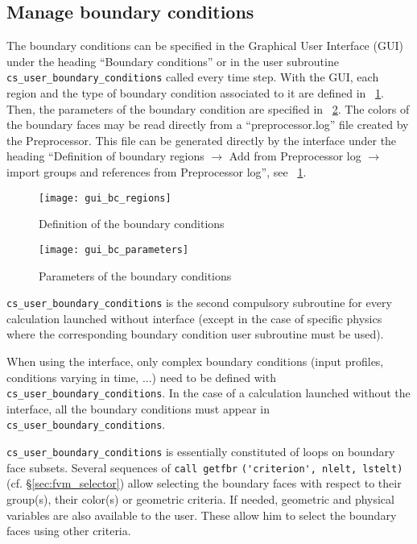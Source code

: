 {{{%
\subsection{Manage boundary conditions}
\label{sec:prg_boundaryconditions}
The boundary conditions can be specified in the Graphical User Interface (GUI) under the heading ``Boundary conditions''
or in the user subroutine \texttt{cs\_user\_boundary\_conditions} called every time step.
With the GUI, each region and the type of boundary condition associated to it are defined in
\figurename~\ref{fig:gui_bc_regions}. Then, the parameters of the boundary condition are specified
 in \figurename~\ref{fig:gui_bc_parameters}. The colors of the boundary faces may be read directly from
a ``preprocessor.log'' file created by the Preprocessor. This file can be generated directly by the interface
under the heading ``Definition of boundary regions $\rightarrow$ Add from Preprocessor log $\rightarrow$ import groups and references from Preprocessor log'', see \figurename~\ref{fig:gui_bc_regions}.
%
\begin{figure}[!ht]
\begin{center}
\texttt{[image: gui\_bc\_regions]}
\caption{Definition of the boundary conditions}
\label{fig:gui_bc_regions}
\end{center}
\end{figure}
%
\begin{figure}[!ht]
\begin{center}
\texttt{[image: gui\_bc\_parameters]}
\caption{Parameters of the boundary conditions}
\label{fig:gui_bc_parameters}
\end{center}
\end{figure}
%
\texttt{cs\_user\_boundary\_conditions} is the second compulsory subroutine for every calculation launched
without interface (except in the case of specific physics where the
corresponding boundary condition user subroutine must be used).

When using the interface, only complex boundary conditions (input profiles, conditions varying in time, ...)
need to be defined with \texttt{cs\_user\_boundary\_conditions}.
In the case of a calculation launched without the
interface, all the boundary conditions must appear in \texttt{cs\_user\_boundary\_conditions}.

\texttt{cs\_user\_boundary\_conditions} is essentially constituted of loops on boundary
face subsets. Several sequences
of \verb+call getfbr+ \verb+('criterion', nlelt, lstelt)+ (cf.
\S\ref{sec:fvm_selector}) allow selecting
the boundary faces with respect to their group(s), their
color(s) or geometric criteria. If needed, geometric and
physical variables are also available to the user. These allow him
to select the boundary faces using other criteria.

}}}
